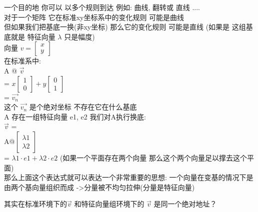\documentclass[12pt]{article}
\begin{document}
一个目的地 你可以 以多个规则到达 例如: 曲线, 翻转或 直线 .... \\
对于一个矩阵 它在标准xy坐标系中的变化规则 可能是曲线 \\
但如果我们把基底一换(非xy坐标) 那么它的变化规则 可能是直线 (如果是 这组基底就是 特征向量 $\lambda$ 只是幅度) \\
向量 $v = \begin{bmatrix}
        x \\
        y
    \end{bmatrix}$ \\
在标准系中: \\
A @ $\vec{v}$ \\
= $x\begin{bmatrix}
        1 \\
        0
    \end{bmatrix} + y\begin{bmatrix}
        0 \\
        1
    \end{bmatrix}$ \\
= $\vec{v_n}$ \\
这个 $\vec{v_n}$ 是个绝对坐标 不存在它在什么基底 \\

A 存在一组特征向量 e1, e2 我们对A执行换底: \\
$\vec{v}$  = \\
A@$\begin{bmatrix}
        \lambda 1 \\
        \lambda 2
    \end{bmatrix}$ \\
= $\lambda1 \cdot e1  + \lambda2 \cdot e2$  (如果一个平面存在两个向量 那么这个两个向量足以撑去这个平面)\\
那么上面这个表达式就可以表达一个非常重要的思想:
一个向量在变基的情况下是由两个基向量组织而成 ->分量被不均匀拉伸(分量是特征向量)

其实在标准环境下的$\vec{v}$ 和特征向量组环境下的 $\vec{v}$ 是同一个绝对地址？
\end{document}
